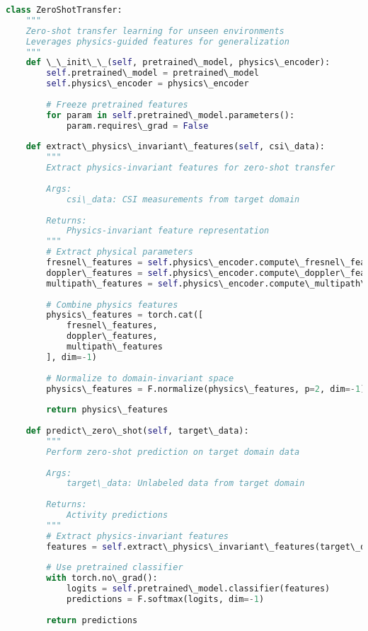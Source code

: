 \documentclass[journal]{IEEEtran}
\begin{document}
\begin{lstlisting}[language=Python, caption=Zero-Shot Transfer Implementation]
class ZeroShotTransfer:
    """
    Zero-shot transfer learning for unseen environments
    Leverages physics-guided features for generalization
    """
    def \_\_init\_\_(self, pretrained\_model, physics\_encoder):
        self.pretrained\_model = pretrained\_model
        self.physics\_encoder = physics\_encoder
        
        # Freeze pretrained features
        for param in self.pretrained\_model.parameters():
            param.requires\_grad = False
        
    def extract\_physics\_invariant\_features(self, csi\_data):
        """
        Extract physics-invariant features for zero-shot transfer
        
        Args:
            csi\_data: CSI measurements from target domain
        
        Returns:
            Physics-invariant feature representation
        """
        # Extract physical parameters
        fresnel\_features = self.physics\_encoder.compute\_fresnel\_features(csi\_data)
        doppler\_features = self.physics\_encoder.compute\_doppler\_features(csi\_data)
        multipath\_features = self.physics\_encoder.compute\_multipath\_features(csi\_data)
        
        # Combine physics features
        physics\_features = torch.cat([
            fresnel\_features,
            doppler\_features,
            multipath\_features
        ], dim=-1)
        
        # Normalize to domain-invariant space
        physics\_features = F.normalize(physics\_features, p=2, dim=-1)
        
        return physics\_features
    
    def predict\_zero\_shot(self, target\_data):
        """
        Perform zero-shot prediction on target domain data
        
        Args:
            target\_data: Unlabeled data from target domain
        
        Returns:
            Activity predictions
        """
        # Extract physics-invariant features
        features = self.extract\_physics\_invariant\_features(target\_data)
        
        # Use pretrained classifier
        with torch.no\_grad():
            logits = self.pretrained\_model.classifier(features)
            predictions = F.softmax(logits, dim=-1)
        
        return predictions
\end{lstlisting}
\end{document}
